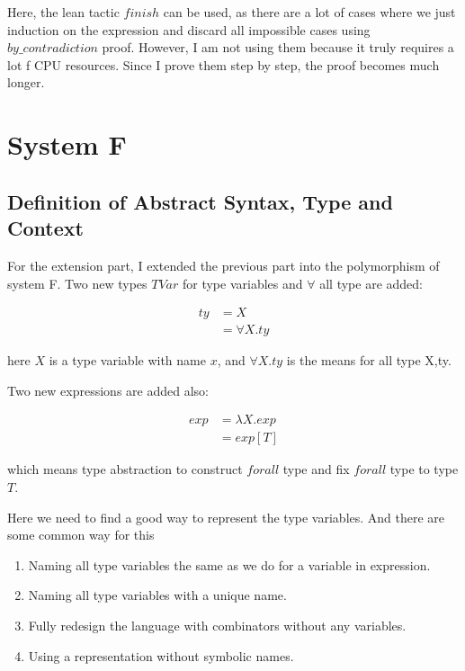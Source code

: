 \documentclass[conference]{IEEEtran}
\begin{document}
Here, the lean tactic $finish$ can be used, as there are a lot of cases where we just induction on the expression and discard all impossible cases using $by\_contradiction$ proof. However, I am not using them because it truly requires a lot f CPU resources. Since I prove them step by step, the proof becomes much longer.

\section{System F}
\subsection{Definition of Abstract Syntax, Type and Context}
For the extension part, I extended the previous part into the polymorphism of system F. Two new types $TVar$ for type variables and $\forall$ all type are added:

\begin{equation} \label{FTy}
	\begin{split}
		ty & = X \\
		& = \forall X.ty
	\end{split}
\end{equation}

here $X$ is a type variable with name $x$, and $\forall X.ty$ is the means for all type X,ty.

Two new expressions are added also:

\begin{equation} \label{FExp}
	\begin{split}
		exp & = \lambda X.exp \\
		& = exp[T]
	\end{split}
\end{equation}

which means type abstraction to construct $forall$ type and fix $forall$ type to type $T$.

Here we need to find a good way to represent the type variables. And there are some
common way for this\cite{pierce2002types}

\begin{enumerate}
	\item Naming all type variables the same as we do for a variable in expression.
	\item Naming all type variables with a unique name.
	\item Fully redesign the language with combinators without any variables.
	\item Using a representation without symbolic names.
\end{enumerate}
\end{document}
